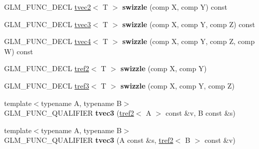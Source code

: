 \begin{DoxyCompactItemize}
\item 
\hypertarget{structglm_1_1detail_1_1tvec3_ab47b6ce6a2d23e20acec37087fb89a7e}{G\-L\-M\-\_\-\-F\-U\-N\-C\-\_\-\-D\-E\-C\-L \hyperlink{structglm_1_1detail_1_1tvec2}{tvec2}$<$ T $>$ {\bfseries swizzle} (comp X, comp Y) const }\label{structglm_1_1detail_1_1tvec3_ab47b6ce6a2d23e20acec37087fb89a7e}

\item 
\hypertarget{structglm_1_1detail_1_1tvec3_ad28f0de773115e3ffb607831537008f9}{G\-L\-M\-\_\-\-F\-U\-N\-C\-\_\-\-D\-E\-C\-L \hyperlink{structglm_1_1detail_1_1tvec3}{tvec3}$<$ T $>$ {\bfseries swizzle} (comp X, comp Y, comp Z) const }\label{structglm_1_1detail_1_1tvec3_ad28f0de773115e3ffb607831537008f9}

\item 
\hypertarget{structglm_1_1detail_1_1tvec3_ada514298c2f2fa218408e94527c6f134}{G\-L\-M\-\_\-\-F\-U\-N\-C\-\_\-\-D\-E\-C\-L \hyperlink{structglm_1_1detail_1_1tvec4}{tvec4}$<$ T $>$ {\bfseries swizzle} (comp X, comp Y, comp Z, comp W) const }\label{structglm_1_1detail_1_1tvec3_ada514298c2f2fa218408e94527c6f134}

\item 
\hypertarget{structglm_1_1detail_1_1tvec3_a2ee36b78d289564828faac8a4f28f683}{G\-L\-M\-\_\-\-F\-U\-N\-C\-\_\-\-D\-E\-C\-L \hyperlink{structglm_1_1detail_1_1tref2}{tref2}$<$ T $>$ {\bfseries swizzle} (comp X, comp Y)}\label{structglm_1_1detail_1_1tvec3_a2ee36b78d289564828faac8a4f28f683}

\item 
\hypertarget{structglm_1_1detail_1_1tvec3_a01f55f26122596b064d2a4ce256d5300}{G\-L\-M\-\_\-\-F\-U\-N\-C\-\_\-\-D\-E\-C\-L \hyperlink{structglm_1_1detail_1_1tref3}{tref3}$<$ T $>$ {\bfseries swizzle} (comp X, comp Y, comp Z)}\label{structglm_1_1detail_1_1tvec3_a01f55f26122596b064d2a4ce256d5300}

\item 
\hypertarget{structglm_1_1detail_1_1tvec3_a9705f6032040ba728ec42047f59e8fa2}{{\footnotesize template$<$typename A, typename B$>$ }\\G\-L\-M\-\_\-\-F\-U\-N\-C\-\_\-\-Q\-U\-A\-L\-I\-F\-I\-E\-R {\bfseries tvec3} (\hyperlink{structglm_1_1detail_1_1tref2}{tref2}$<$ A $>$ const \&v, B const \&s)}\label{structglm_1_1detail_1_1tvec3_a9705f6032040ba728ec42047f59e8fa2}

\item 
\hypertarget{structglm_1_1detail_1_1tvec3_aece9e36bdf4a35b681c6f50dc21ae917}{{\footnotesize template$<$typename A, typename B$>$ }\\G\-L\-M\-\_\-\-F\-U\-N\-C\-\_\-\-Q\-U\-A\-L\-I\-F\-I\-E\-R {\bfseries tvec3} (A const \&s, \hyperlink{structglm_1_1detail_1_1tref2}{tref2}$<$ B $>$ const \&v)}\label{structglm_1_1detail_1_1tvec3_aece9e36bdf4a35b681c6f50dc21ae917}


\end{DoxyCompactItemize}
